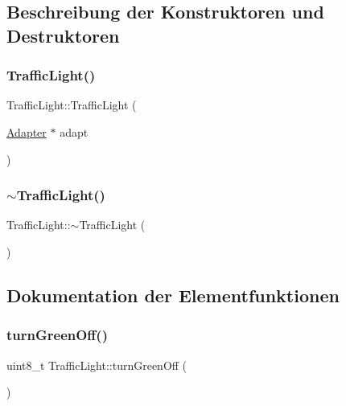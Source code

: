 \subsection{Beschreibung der Konstruktoren und Destruktoren}
\hypertarget{class_traffic_light_ac34af2ea06577584a1c30a4f40e2d521}{}\label{class_traffic_light_ac34af2ea06577584a1c30a4f40e2d521} 
\subsubsection{\texorpdfstring{Traffic\+Light()}{TrafficLight()}}
{\footnotesize\ttfamily Traffic\+Light\+::\+Traffic\+Light (\begin{DoxyParamCaption}\item[{\hyperlink{class_adapter}{Adapter} $\ast$}]{adapt }\end{DoxyParamCaption})}

\hypertarget{class_traffic_light_a3dd2a89a028c1586ced0ab587dda8cc1}{}\label{class_traffic_light_a3dd2a89a028c1586ced0ab587dda8cc1} 
\subsubsection{\texorpdfstring{$\sim$\+Traffic\+Light()}{~TrafficLight()}}
{\footnotesize\ttfamily Traffic\+Light\+::$\sim$\+Traffic\+Light (\begin{DoxyParamCaption}{ }\end{DoxyParamCaption})}



\subsection{Dokumentation der Elementfunktionen}
\hypertarget{class_traffic_light_a958814eefaf288da1e103bf32c5c38b9}{}\label{class_traffic_light_a958814eefaf288da1e103bf32c5c38b9} 
\subsubsection{\texorpdfstring{turn\+Green\+Off()}{turnGreenOff()}}
{\footnotesize\ttfamily uint8\+\_\+t Traffic\+Light\+::turn\+Green\+Off (\begin{DoxyParamCaption}{ }\end{DoxyParamCaption})}

